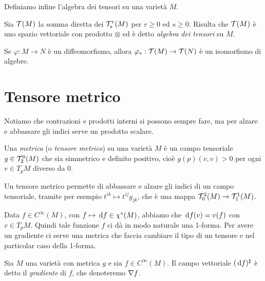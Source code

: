 Definiamo infine l'algebra dei tensori su una varietà $M$.
\begin{definition} 
	Sia $\mathcal T(M)$ la somma diretta dei $\mathcal T_s^r(M)$ per $r\ge 0$ ed $s\ge 0$. Risulta che $\mathcal T(M)$ è uno spazio vettoriale con prodotto $\otimes$ ed è detto \emph{algebra dei tensori} su $M$.
\end{definition}

\begin{remark}
Se $\varphi:M\to N$ è un diffeomorfismo, allora $\varphi_*: \mathcal T(M) \to \mathcal T(N)$ è un isomorfismo di algebre.
\end{remark}

\section{Tensore metrico}

Notiamo che contrazioni e prodotti interni si possono sempre fare, ma per alzare e abbassare gli indici serve un prodotto scalare.

\begin{definition}  
	Una \emph{metrica} (o \emph{tensore metrico}) su una varietà $M$ è un campo tensoriale $g \in \mathcal T_2^0(M)$ che sia simmetrico e definito positivo, cioè $g(p)(v,v)>0$ per ogni $v\in T_pM$ diverso da 0.
\end{definition}

Un tensore metrico permette di abbassare e alzare gli indici di un campo tensoriale, tramite per esempio $t^{ik} \mapsto t^{ij}g_{jk}$, che è una mappa $\mathcal T_0^2(M) \to \mathcal T_1^1(M)$.

Data $f\in C^\infty(M)$, con $f \mapsto \,\mathrm d f \in \chi^*(M)$, abbiamo che $\,\mathrm d f(v) = v(f)$ con $v \in T_pM$. Quindi tale funzione $f$ ci dà in modo naturale una 1-forma.
Per avere un gradiente ci serve una metrica che faccia cambiare il tipo di un tensore e nel particolar caso della 1-forma. %

\begin{definition}
	Sia $M$ una varietà con metrica $g$ e sia $f \in C^\infty(M)$. Il campo vettoriale $(\,\mathrm d f)^\sharp$ è detto il \emph{gradiente} di $f$, che denoteremo $\nabla f$. %
\end{definition}

